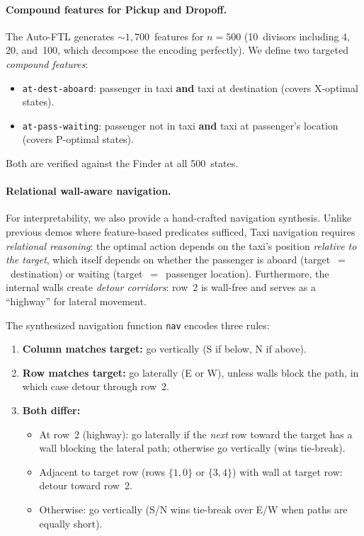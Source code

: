 \paragraph{Compound features for Pickup and Dropoff.}
The Auto-FTL generates ${\sim}1{,}700$~features for $n = 500$ (10~divisors including 4, 20, and~100, which decompose the encoding perfectly).  We define two targeted \emph{compound features}:
\begin{itemize}
\item \texttt{at-dest-aboard}: passenger in taxi \textbf{and} taxi at destination (covers X-optimal states).
\item \texttt{at-pass-waiting}: passenger not in taxi \textbf{and} taxi at passenger's location (covers P-optimal states).
\end{itemize}
\noindent Both are verified against the Finder at all 500~states.

\paragraph{Relational wall-aware navigation.}
For interpretability, we also provide a hand-crafted navigation synthesis.  Unlike previous demos where feature-based predicates sufficed, Taxi navigation requires \emph{relational reasoning}: the optimal action depends on the taxi's position \emph{relative to the target}, which itself depends on whether the passenger is aboard (target~$=$~destination) or waiting (target~$=$~passenger location).  Furthermore, the internal walls create \emph{detour corridors}: row~2 is wall-free and serves as a ``highway'' for lateral movement.

The synthesized navigation function \texttt{nav} encodes three rules:
\begin{enumerate}
\item \textbf{Column matches target:} go vertically (S if below, N if above).
\item \textbf{Row matches target:} go laterally (E or W), unless walls block the path, in which case detour through row~2.
\item \textbf{Both differ:}
  \begin{itemize}
  \item At row~2 (highway): go laterally if the \emph{next} row toward the target has a wall blocking the lateral path; otherwise go vertically (wins tie-break).
  \item Adjacent to target row (rows $\{1{,}0\}$ or $\{3{,}4\}$) with wall at target row: detour toward row~2.
  \item Otherwise: go vertically (S/N wins tie-break over E/W when paths are equally short).
  \end{itemize}
\end{enumerate}

